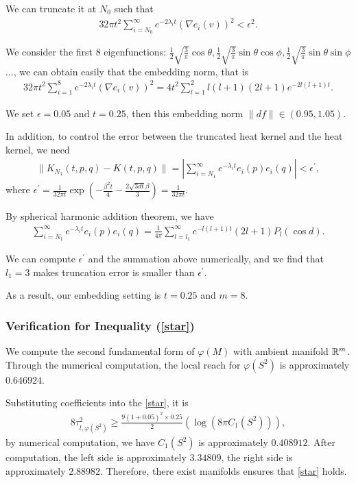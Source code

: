 We can truncate it at $N_0$ such that 
\begin{align}
	32\pi t^2 \sum_{i=N_0}^{\infty} e^{-2\lambda_i t} (\nabla e_i (v))^2 <\epsilon^2.
\end{align}


We consider the first $8$ eigenfunctions: $\frac{1}{2}\sqrt{\frac{3}{\pi}}\cos \theta, \frac{1}{2}\sqrt{\frac{3}{\pi}}\sin \theta \cos \phi, \frac{1}{2}\sqrt{\frac{3}{\pi}}\sin \theta \sin \phi$ $\dots$, we can obtain easily that the embedding norm, that is
\begin{align}
32\pi t^2 \sum_{i=1}^{8} e^{-2\lambda_i t} (\nabla e_i (v))^2  = 4t^2\sum_{l=1}^2 l(l+1)(2l+1)e^{-2l(l+1)t}.
\end{align}

We set $\epsilon = 0.05$ and $t=0.25$, then this embedding norm $\|df\| \in (0.95,1.05)$.

In addition, to control the error between the truncated heat kernel and the heat kernel, we need
\begin{align}
	\|K_{N_1}(t,p,q) - K(t,p,q)\| = |\sum_{i=N_1}^{\infty} e^{-\lambda_i t} e_i(p) e_i(q)| < \epsilon^\prime,
\end{align}
where $\epsilon^\prime= \frac{1}{32 \pi t}\exp\left(-\frac{\beta^2 t}{4}-\frac{2\sqrt{3dt} \beta}{3}\right) = \frac{1}{32 \pi t}$.

By spherical harmonic addition theorem, we have
\begin{align}
\sum_{i=N_1}^{\infty} e^{-\lambda_i t} e_i(p) e_i(q) = \frac{1}{4\pi}\sum_{l=l_1}^{\infty}e^{-l(l+1)t}(2l+1) P_l(\cos d).
\end{align}

We can compute $\epsilon^\prime$ and the summation above numerically, and we find that $l_1=3$ makes truncation error is smaller than $\epsilon^\prime$.

As a result, our embedding setting is $t=0.25$ and $m=8$.
 

\subsubsection{Verification for Inequality (\ref{star})}

We compute the second fundamental form of $\varphi(M)$ with ambient manifold $\mathbb{R}^m$. Through the numerical computation, the local reach for $\varphi(S^2)$ is approximately $0.646924$. 

Substituting coefficients into the \cref{star}, it is
\begin{align}
	8\tau^2_{l,\varphi(S^2)} 
	\geq \frac{9(1+0.05)^2\times 0.25}{2}\left(\log\left(8 \pi C_1(S^2)\right)\right),
\end{align}
by numerical computation, we have $C_1(S^2)$ is approximately $0.408912$. After computation, the left side is approximately $3.34809$, the right side is approximately $2.88982$. Therefore, there exist manifolds ensures that \cref{star} holds.